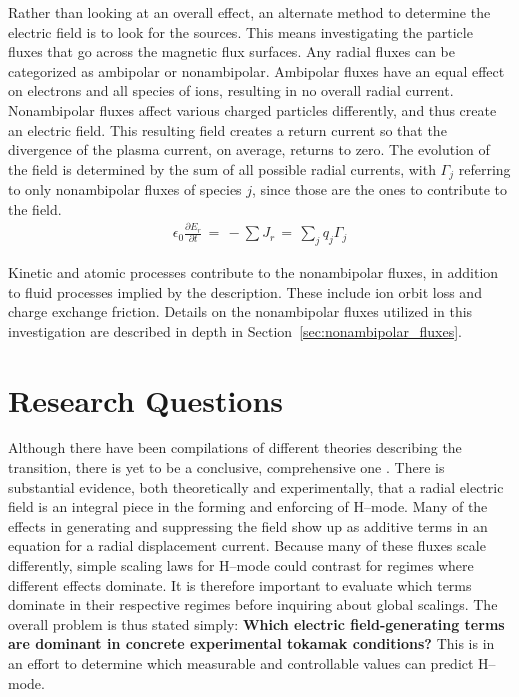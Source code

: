 Rather than looking at an overall effect, an alternate method to determine the electric field is to look for the sources.
This means investigating the particle fluxes that go across the magnetic flux surfaces.
Any radial fluxes can be categorized as ambipolar or nonambipolar.
Ambipolar fluxes have an equal effect on electrons and all species of ions, resulting in no overall radial current.
Nonambipolar fluxes affect various charged particles differently, and thus create an electric field.
This resulting field creates a return current so that the divergence of the plasma current, on average, returns to zero.
The evolution of the field is determined by the sum of all possible radial currents, with $\Gamma_j$ referring to only nonambipolar fluxes of species $j$, since those are the ones to contribute to the field.
\begin{align} %
	\epsilon_0 \frac{\partial E_r}{\partial t} \,=\, -\sum J_r \,=\, \sum_j q_j\Gamma_j
	\label{eq:ambipolarity_constraint}
\end{align}

Kinetic and atomic processes contribute to the nonambipolar fluxes, in addition to fluid processes implied by the description.
These include ion orbit loss and charge exchange friction.
Details on the nonambipolar fluxes utilized in this investigation are described in depth in Section~\ref{sec:nonambipolar_fluxes}.

\section{Research Questions}\label{sec:research_questions}
Although there have been compilations of different theories describing the transition, there is yet to be a conclusive, comprehensive one \cite{connor_review_2000}.
There is substantial evidence, both theoretically and experimentally, that a radial electric field is an integral piece in the forming and enforcing of H--mode.
Many of the effects in generating and suppressing the field show up as additive terms in an equation for a radial displacement current.
Because many of these fluxes scale differently, simple scaling laws for H--mode could contrast for regimes where different effects dominate.
It is therefore important to evaluate which terms dominate in their respective regimes before inquiring about global scalings.
The overall problem is thus stated simply: \textbf{Which electric field-generating terms are dominant in concrete experimental tokamak conditions?}
This is in an effort to determine which measurable and controllable values can predict H--mode.

